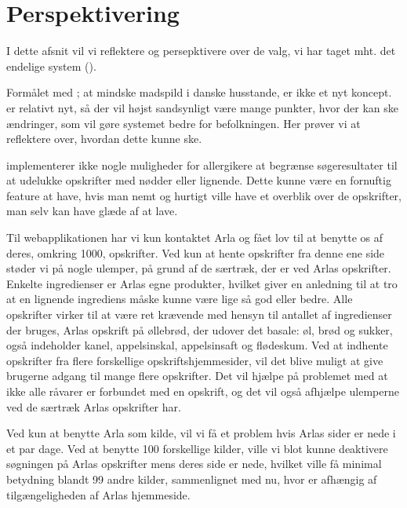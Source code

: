 \section{Perspektivering}
\label{sec:perspektivering}
I dette afsnit vil vi reflektere og persepktivere over de valg, vi har taget mht. det endelige system (\Foodl{}).

Formålet med \Foodl{}; at mindske madspild i danske husstande, er ikke et nyt koncept. \Foodl{} er relativt nyt, så der vil højst sandsynligt være mange punkter, hvor der kan ske ændringer, som vil gøre systemet bedre for befolkningen. Her prøver vi at reflektere over, hvordan dette kunne ske.

\Foodl{} implementerer ikke nogle muligheder for \fx allergikere at begrænse søgeresultater til \fx at udelukke opskrifter med nødder eller lignende. Dette kunne være en fornuftig feature at have, hvis man nemt og hurtigt ville have et overblik over de opskrifter, man selv kan have glæde af at lave.

Til webapplikationen \Foodl{} har vi kun kontaktet Arla og fået lov til at benytte os af deres, omkring 1000, opskrifter. Ved kun at hente opskrifter fra denne ene side støder vi på nogle ulemper, på grund af de særtræk, der er ved Arlas opskrifter. Enkelte ingredienser er Arlas egne produkter, hvilket giver en anledning til at tro at en lignende ingrediens måske kunne være lige så god eller bedre. Alle opskrifter virker til at være ret krævende med hensyn til antallet af ingredienser der bruges, \fx Arlas opskrift på øllebrød, der udover det basale: øl, brød og sukker, også indeholder kanel, appelsinskal, appelsinsaft og flødeskum. Ved at indhente opskrifter fra flere forskellige opskriftshjemmesider, vil det blive muligt at give brugerne adgang til mange flere opskrifter. Det vil hjælpe på problemet med at ikke alle råvarer er forbundet med en opskrift, og det vil også afhjælpe ulemperne ved de særtræk Arlas opskrifter har. 

Ved kun at benytte Arla som kilde, vil vi få et problem hvis Arlas sider er nede i et par dage. Ved at benytte 100 forskellige kilder, ville vi blot kunne deaktivere søgningen på Arlas opskrifter mens deres side er nede, hvilket ville få minimal betydning blandt 99 andre kilder, sammenlignet med nu, hvor \Foodl{} er afhængig af tilgængeligheden af Arlas hjemmeside.


